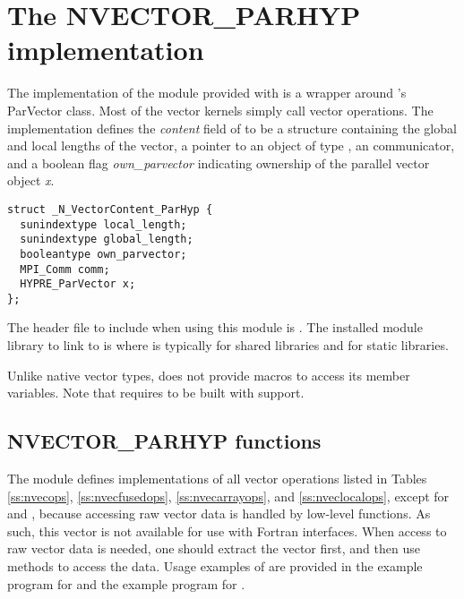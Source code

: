 %
\section{The NVECTOR\_PARHYP implementation}\label{ss:nvec_parhyp}

The {\nvecph} implementation of the {\nvector} module provided with
{\sundials} is a wrapper around {\hypre}'s ParVector class. 
Most of the vector kernels simply call {\hypre} vector operations. 
The implementation defines the {\em content} field of  to 
be a structure containing the global and local lengths of the vector, a 
pointer to an object of type , an {\mpi} communicator, 
and a boolean flag {\em own\_parvector} indicating ownership of the
{\hypre} parallel vector object {\em x}.
\begin{verbatim}
struct _N_VectorContent_ParHyp {
  sunindextype local_length;
  sunindextype global_length;
  booleantype own_parvector;
  MPI_Comm comm;
  HYPRE_ParVector x;
};
\end{verbatim}
The header file to include when using this module is .
The installed module library to link to is
where  is typically  for shared libraries and 
for static libraries.

Unlike native {\sundials} vector types, {\nvecph} does not provide macros 
to access its member variables.
Note that {\nvecph} requires {\sundials} to be built with {\mpi} support.


\subsection{NVECTOR\_PARHYP functions}
\label{ss:nvec_parhyp_functions}

The {\nvecph} module defines implementations of all vector operations 
listed in Tables \ref{ss:nvecops}, \ref{ss:nvecfusedops},
\ref{ss:nvecarrayops}, and \ref{ss:nveclocalops}, except
for  and , because accessing raw vector
data is handled by low-level {\hypre} functions.
As such, this vector is not available for use with {\sundials} Fortran interfaces.
When access to raw vector data is needed, one
should extract the {\hypre} vector first, and then use {\hypre}
methods to access the data. Usage examples of {\nvecph} are provided in
the  example program for {\cvode} \cite{cvode_ex}
and the  example program for {\arkode} \cite{arkode_ex}.

